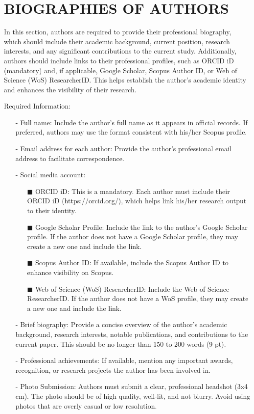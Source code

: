 \documentclass{iaesarticle}
\begin{document}
\section*{BIOGRAPHIES OF AUTHORS} 
\normalsize
In this section, authors are required to provide their professional biography, which should include their academic background, current position, research interests, and any significant contributions to the current study. Additionally, authors should include links to their professional profiles, such as ORCID iD (mandatory) and, if applicable, Google Scholar, Scopus Author ID, or Web of Science (WoS) ResearcherID. This helps establish the author’s academic identity and enhances the visibility of their research.

\noindent Required Information:
\begin{itemize}[topsep=0.3ex, itemsep=0.3ex, parsep=0.2ex]
	\item[-] Full name: Include the author's full name as it appears in official records. If preferred, authors may use the format consistent with his/her Scopus profile.
	\item[-] Email address for each author: Provide the author's professional email address to facilitate correspondence.
	\item[-] Social media account:
	\begin{itemize}[topsep=0.3ex, itemsep=0.3ex, parsep=0.2ex]
		\item[$\blacksquare$] ORCID iD: This is a mandatory. Each author must include their ORCID iD (https://orcid.org/), which helps link his/her research output to their identity.
		\item[$\blacksquare$] Google Scholar Profile: Include the link to the author's Google Scholar profile. If the author does not have a Google Scholar profile, they may create a new one and include the link.
		\item[$\blacksquare$] Scopus Author ID: If available, include the Scopus Author ID to enhance visibility on Scopus.
		\item[$\blacksquare$] Web of Science (WoS) ResearcherID: Include the Web of Science ResearcherID. If the author does not have a WoS profile, they may create a new one and include the link.
	\end{itemize}
	\item[-] Brief biography: Provide a concise overview of the author's academic background, research interests, notable publications, and contributions to the current paper. This should be no longer than 150 to 200 words (9 pt).
	\item[-] Professional achievements: If available, mention any important awards, recognition, or research projects the author has been involved in.
	\item[-] Photo Submission: Authors must submit a clear, professional headshot (3x4 cm). The photo should be of high quality, well-lit, and not blurry. Avoid using photos that are overly casual or low resolution.
\end{itemize}
\end{document}
